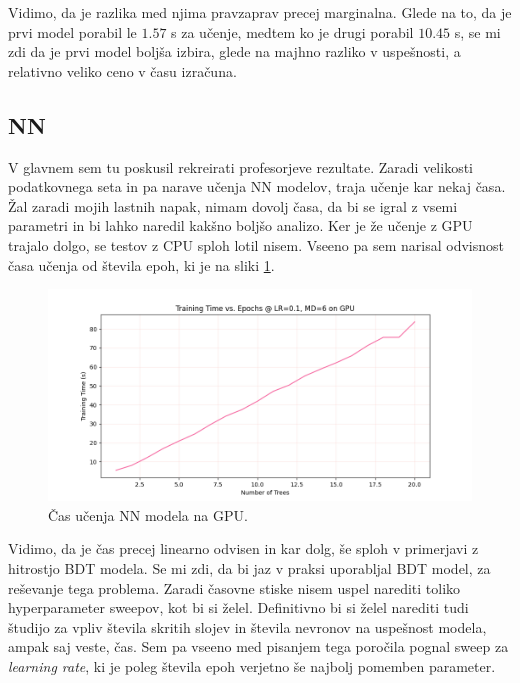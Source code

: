 \documentclass[a4paper]{article}
\begin{document}
Vidimo, da je razlika med njima pravzaprav precej marginalna. Glede na to, da je prvi model porabil le $1.57$ s za učenje,
medtem ko je drugi porabil $10.45$ s, se mi zdi da je prvi model boljša izbira, glede na majhno razliko v uspešnosti, a relativno 
veliko ceno v času izračuna.
\subsection{NN}
V glavnem sem tu poskusil rekreirati profesorjeve rezultate. Zaradi velikosti podatkovnega seta in pa narave 
učenja NN modelov, traja učenje kar nekaj časa. Žal zaradi mojih lastnih napak, nimam dovolj časa, da bi se 
igral z vsemi parametri in bi lahko naredil kakšno boljšo analizo. Ker je že učenje z GPU trajalo dolgo, 
se testov z CPU sploh lotil nisem. Vseeno pa sem narisal odvisnost časa učenja od števila epoh, ki je na sliki
\ref{fig:NN_times}. \\

\begin{figure}[H]
    \centering
    \includegraphics[width=1\textwidth]{../images/NNraw_performance.png}
    \caption{Čas učenja NN modela na GPU.}
    \label{fig:NN_times}
\end{figure}

Vidimo, da je čas precej linearno odvisen in kar dolg, še sploh v primerjavi z hitrostjo BDT modela. Se mi zdi,
da bi jaz v praksi uporabljal BDT model, za reševanje tega problema. Zaradi časovne stiske nisem uspel narediti
toliko hyperparameter sweepov, kot bi si želel. Definitivno bi si želel narediti tudi študijo za vpliv števila
skritih slojev in števila nevronov na uspešnost modela, ampak saj veste, čas. Sem pa vseeno med pisanjem tega
poročila pognal sweep za \textit{learning rate}, ki je poleg števila epoh verjetno še najbolj pomemben parameter.
\end{document}

